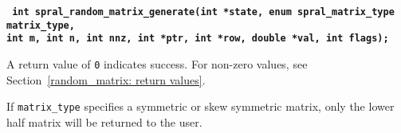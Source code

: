 \vspace*{0.1cm}
\noindent
\textbf{\texttt{
      \hspace*{0.3cm} int spral\_random\_matrix\_generate(int *state, enum spral\_matrix\_type matrix\_type, \\
       \hspace*{0.7cm} int m, int n, int nnz, int *ptr, int *row, double *val, int flags);
}}
\vspace*{0.3cm}

\noindent
A return value of \texttt{0} indicates success. For non-zero values, see Section~\ref{random_matrix: return values}.

\noindent
If \texttt{matrix\_type} specifies a
symmetric or skew symmetric matrix, only the lower half matrix will be returned
to the user.

\vspace*{-3mm}
